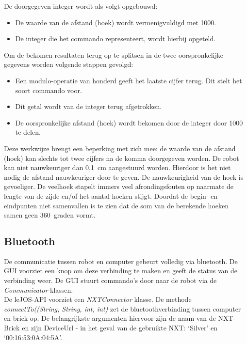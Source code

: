 \documentclass[eind]{penoverslag}
\begin{document}
De doorgegeven integer wordt als volgt opgebouwd:

\begin{itemize}
\item De waarde van de afstand (hoek) wordt vermenigvuldigd met 1000.
\item De integer die het commando representeert, wordt hierbij opgeteld.
\end{itemize}

Om de bekomen resultaten terug op te splitsen in de twee oorspronkelijke gegevens worden volgende stappen gevolgd:

\begin{itemize}
\item Een modulo-operatie van honderd geeft het laatste cijfer terug. Dit stelt het soort commando voor.
\item Dit getal wordt van de integer terug afgetrokken.
\item De oorspronkelijke afstand (hoek) wordt bekomen door de integer door 1000 te delen.
\end{itemize}

Deze werkwijze brengt een beperking met zich mee: de waarde van de afstand (hoek) kan slechts tot twee cijfers na de komma doorgegeven worden. De robot kan niet nauwkeuriger dan 0,1~cm aangestuurd worden. Hierdoor is het niet nodig de afstand nauwkeuriger door te geven. De nauwkeurigheid van de hoek is gevoeliger. De veelhoek stapelt immers veel afrondingsfouten op naarmate de lengte van de zijde en/of het aantal hoeken stijgt. Doordat de begin- en eindpunten niet samenvallen is te zien dat de som van de berekende hoeken samen geen 360~graden vormt. 

\subsection{Bluetooth} %
\label{ssec:bluetooth}
De communicatie tussen robot en computer gebeurt volledig via bluetooth. De GUI voorziet een knop om deze verbinding te maken en geeft de status van de verbinding weer. De GUI stuurt commando's door naar de robot via de \textit{Communicator}-klassen.\\

De leJOS-API \cite{leJOS} voorziet een \textit{NXTConnector} klasse. De methode \textit{connectTo((String, String, int, int)} zet de bluetoothverbinding tussen computer en brick op. De belangrijkste argumenten hiervoor zijn de naam van de NXT-Brick en zijn DeviceUrl  - in het geval van de gebruikte NXT: `Silver' en `00:16:53:0A:04:5A'.\\
\end{document}
